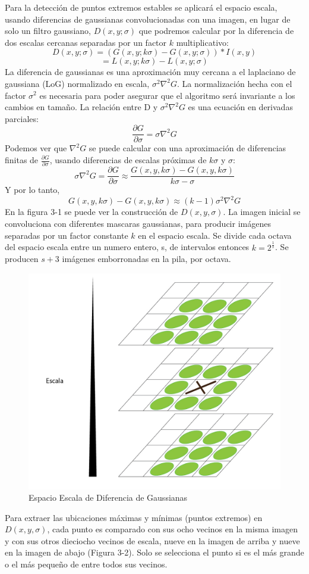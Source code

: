 		Para la detección de puntos extremos estables se aplicará el espacio escala, usando diferencias de gaussianas convolucionadas con una imagen, en lugar de solo un filtro gaussiano, $D(x,y;\sigma)$  que podremos calcular por la diferencia de dos escalas cercanas separadas por un factor $k$ multiplicativo:
		$$D(x,y;\sigma) = (G(x,y;k\sigma) - G(x,y;\sigma)) * I(x,y)$$ $$= L(x,y;k\sigma) - L(x,y;\sigma)$$
		La diferencia de gaussianas es una aproximación muy cercana a el laplaciano de gaussiana (LoG) normalizado en escala, $\sigma^2 \nabla^2 G$. La normalización hecha con el factor $\sigma^2$ es necesaria para poder asegurar que el algoritmo será invariante a los cambios en tamaño. La relación entre D y $\sigma^2 \nabla^2 G$ es una ecuación en derivadas parciales:
		$$\frac{\partial G}{\partial \sigma} = \sigma \nabla^2 G$$
		Podemos ver que $\nabla^2 G$ se puede calcular con una aproximación de diferencias finitas de  $\frac{\partial G}{\partial \sigma}$, usando diferencias de escalas próximas de $k\sigma$ y $\sigma$:
		$$ \sigma \nabla^2 G = \frac{ \partial G}{\partial \sigma} \approx  \frac{G(x , y , k \sigma) - G( x , y, k \sigma)}{k \sigma - \sigma}$$
		Y por lo tanto,
		$$ G(x , y , k \sigma) - G( x , y, k \sigma) \approx (k - 1)\sigma^2 \nabla^2 G $$
		En la figura 3-1 se puede ver la construcción de $D(x,y,\sigma)$. La imagen inicial se convoluciona con diferentes mascaras gaussianas, para producir imágenes separadas por un factor constante $k$ en el espacio escala. Se divide cada octava del espacio escala entre un numero entero, s, de intervalos entonces $k= 2^\frac{1}{s}$. Se producen $s+3$  imágenes emborronadas en la pila, por octava.
		\begin{figure}[h]
			\centering
				\includegraphics[scale=0.3]{img/EscalaPuntosExtremos.jpg}
			\caption{Espacio Escala de Diferencia de Gaussianas}
		\end{figure}
		Para extraer las ubicaciones máximas y mínimas (puntos extremos) en $D(x,y,\sigma)$, cada punto es comparado con sus ocho vecinos en la misma imagen y con sus otros dieciocho vecinos de escala, nueve en la imagen de arriba y nueve en la imagen de abajo (Figura 3-2). Solo se selecciona el punto si es el más grande o el más pequeño de entre todos sus vecinos.
	
